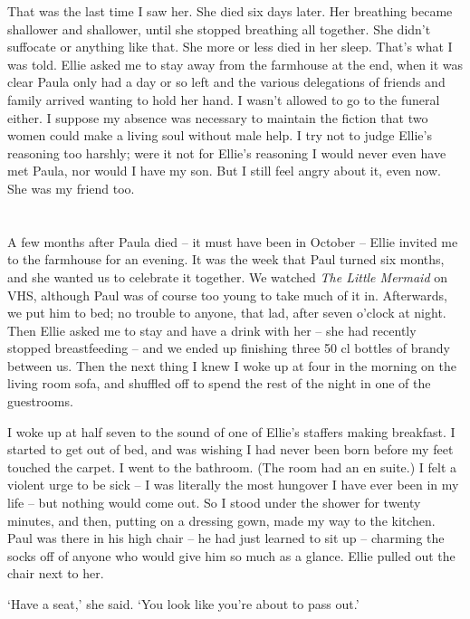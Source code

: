 That was the last time I saw her. She died six days later. Her breathing became shallower and shallower, until she stopped breathing all together. She didn't suffocate or anything like that. She more or less died in her sleep. That's what I was told. Ellie asked me to stay away from the farmhouse at the end, when it was clear Paula only had a day or so left and the various delegations of friends and family arrived wanting to hold her hand. I wasn't allowed to go to the funeral either. I suppose my absence was necessary to maintain the fiction that two women could make a living soul without male help. I try not to judge Ellie's reasoning too harshly; were it not for Ellie's reasoning I would never even have met Paula, nor would I have my son. But I still feel angry about it, even now. She was my friend too.

\section{}

A few months after Paula died -- it must have been in October -- Ellie invited me to the farmhouse for an evening. It was the week that Paul turned six months, and she wanted us to celebrate it together. We watched \textit{The Little Mermaid} on VHS, although Paul was of course too young to take much of it in. Afterwards, we put him to bed; no trouble to anyone, that lad, after seven o'clock at night. Then Ellie asked me to stay and have a drink with her -- she had recently stopped breastfeeding -- and we ended up finishing three 50 cl bottles of brandy between us. Then the next thing I knew I woke up at four in the morning on the living room sofa, and shuffled off to spend the rest of the night in one of the guestrooms.

I woke up at half seven to the sound of one of Ellie's staffers making breakfast. I started to get out of bed, and was wishing I had never been born before my feet touched the carpet. I went to the bathroom. (The room had an en suite.) I felt a violent urge to be sick -- I was literally the most hungover I have ever been in my life -- but nothing would come out. So I stood under the shower for twenty minutes, and then, putting on a dressing gown, made my way to the kitchen. Paul was there in his high chair -- he had just learned to sit up -- charming the socks off of anyone who would give him so much as a glance. Ellie pulled out the chair next to her.

`Have a seat,' she said. `You look like you're about to pass out.'

